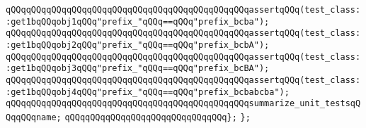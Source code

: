 \verb|qQQqqQQqqQQqqQQqqQQqqQQqqQQqqQQqqQQqqQQqqQQqqQQqassertqQQq(test_class::get1bqQQqobj1qQQq"prefix_"qQQq==qQQq"prefix_bcba");|\newline
\verb|qQQqqQQqqQQqqQQqqQQqqQQqqQQqqQQqqQQqqQQqqQQqqQQqassertqQQq(test_class::get1bqQQqobj2qQQq"prefix_"qQQq==qQQq"prefix_bcbA");|\newline
\verb|qQQqqQQqqQQqqQQqqQQqqQQqqQQqqQQqqQQqqQQqqQQqqQQqassertqQQq(test_class::get1bqQQqobj3qQQq"prefix_"qQQq==qQQq"prefix_bcBA");|\newline
\verb|qQQqqQQqqQQqqQQqqQQqqQQqqQQqqQQqqQQqqQQqqQQqqQQqassertqQQq(test_class::get1bqQQqobj4qQQq"prefix_"qQQq==qQQq"prefix_bcbabcba");|\newline
\newline
\verb|qQQqqQQqqQQqqQQqqQQqqQQqqQQqqQQqqQQqqQQqqQQqqQQqsummarize_unit_testsqQQqqQQqname;|\newline
\verb|qQQqqQQqqQQqqQQqqQQqqQQqqQQqqQQq};|\newline
\verb|};|\newline
\newline

